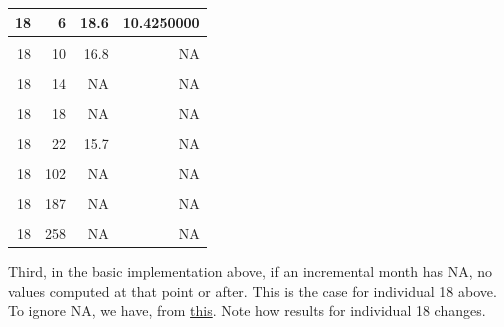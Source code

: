 \documentclass[
]{book}
\begin{document}
\begin{table}[!h]
\begin{tabular}{r|r|r|r}
\hline
18 & 6 & 18.6 & 10.4250000\\
\hline
\cellcolor{gray!6}{18} & \cellcolor{gray!6}{8} & \cellcolor{gray!6}{NA} & \cellcolor{gray!6}{NA}\\
\hline
18 & 10 & 16.8 & NA\\
\hline
\cellcolor{gray!6}{18} & \cellcolor{gray!6}{12} & \cellcolor{gray!6}{NA} & \cellcolor{gray!6}{NA}\\
\hline
18 & 14 & NA & NA\\
\hline
\cellcolor{gray!6}{18} & \cellcolor{gray!6}{16} & \cellcolor{gray!6}{NA} & \cellcolor{gray!6}{NA}\\
\hline
18 & 18 & NA & NA\\
\hline
\cellcolor{gray!6}{18} & \cellcolor{gray!6}{20} & \cellcolor{gray!6}{NA} & \cellcolor{gray!6}{NA}\\
\hline
18 & 22 & 15.7 & NA\\
\hline
\cellcolor{gray!6}{18} & \cellcolor{gray!6}{24} & \cellcolor{gray!6}{22.5} & \cellcolor{gray!6}{NA}\\
\hline
18 & 102 & NA & NA\\
\hline
\cellcolor{gray!6}{18} & \cellcolor{gray!6}{138} & \cellcolor{gray!6}{NA} & \cellcolor{gray!6}{NA}\\
\hline
18 & 187 & NA & NA\\
\hline
\cellcolor{gray!6}{18} & \cellcolor{gray!6}{224} & \cellcolor{gray!6}{NA} & \cellcolor{gray!6}{NA}\\
\hline
18 & 258 & NA & NA\\
\hline
\end{tabular}
\end{table}

Third, in the basic implementation above, if an incremental month has NA, no values computed at that point or after. This is the case for individual 18 above. To ignore NA, we have, from \href{https://stackoverflow.com/a/49906718/8280804}{this}. Note how results for individual 18 changes.
\end{document}
